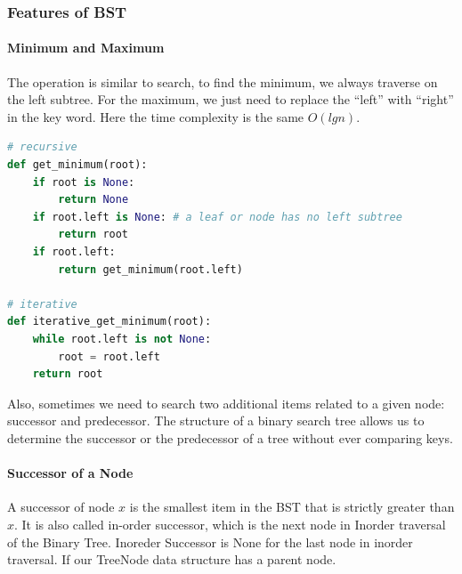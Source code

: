 \documentclass[../main.tex]{subfiles}
\begin{document}
\subsubsection{Features of BST}
\label{concept_features_bst}
\paragraph{Minimum and Maximum} The operation is similar to search, to find the minimum, we always traverse on the left subtree.  For the maximum, we just need to replace the ``left'' with ``right'' in the key word.  Here the time complexity is the same $O(lgn)$.
\begin{lstlisting}[language=Python]
# recursive
def get_minimum(root):
    if root is None:
        return None
    if root.left is None: # a leaf or node has no left subtree
        return root
    if root.left:
        return get_minimum(root.left)

# iterative
def iterative_get_minimum(root):
    while root.left is not None:
        root = root.left
    return root
\end{lstlisting}

Also, sometimes we need to search two additional items related to a given node:  successor and predecessor. The structure of a binary search tree allows us to determine the successor or the predecessor of a tree without ever comparing keys. 

\paragraph{Successor of a Node}  A successor of node $x$ is the smallest item in the BST that is strictly greater than $x$. It is also called in-order successor, which is the next node in Inorder traversal of the Binary Tree. Inoreder Successor is None for the last node in inorder traversal. If our TreeNode data structure has a parent node.
\end{document}
